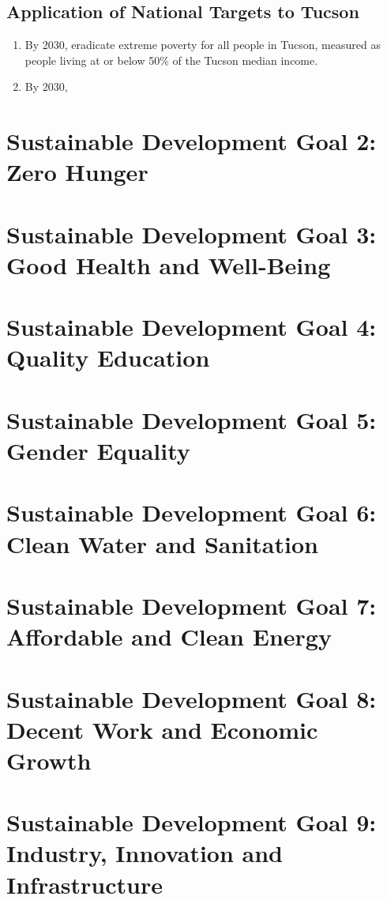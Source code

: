 \documentclass[11pt]{book}
\begin{document}
	\section{Application of National Targets to Tucson}
	
	\begin{enumerate}
		\item By 2030, eradicate extreme poverty for all people in Tucson, measured as people living at or below 50\% of the Tucson median income.
		\item By 2030,
	\end{enumerate} 

\chapter{Sustainable Development Goal 2: Zero Hunger}

\chapter{Sustainable Development Goal 3: Good Health and Well-Being}

\chapter{Sustainable Development Goal 4: Quality Education}

\chapter{Sustainable Development Goal 5: Gender Equality}

\chapter{Sustainable Development Goal 6: Clean Water and Sanitation}

\chapter{Sustainable Development Goal 7: Affordable and Clean Energy}

\chapter{Sustainable Development Goal 8: Decent Work and Economic Growth}

\chapter{Sustainable Development Goal 9: Industry, Innovation and Infrastructure}
\end{document}

